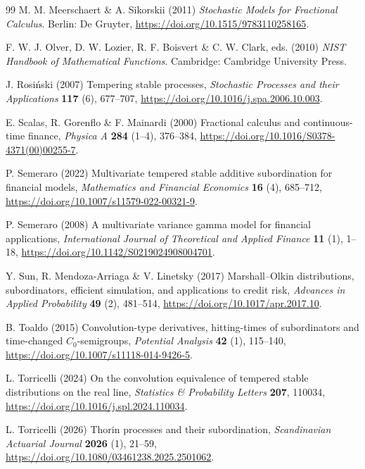 \documentclass{ws-ijtaf}
\begin{document}
\begin{thebibliography}{99}
 M. M. Meerschaert \&
A. Sikorskii (2011) {\it Stochastic Models for Fractional Calculus}. Berlin: De
Gruyter, \url{https://doi.org/10.1515/9783110258165}.

 F. W. J. Olver, D. W. Lozier,
R. F. Boisvert \& C. W. Clark, eds. (2010) {\it NIST Handbook of Mathematical
Functions}. Cambridge: Cambridge University Press.

 J. Rosiński (2007) Tempering stable processes,
{\it Stochastic Processes and their Applications} {\bf 117} (6), 677--707,
\url{https://doi.org/10.1016/j.spa.2006.10.003}.

 E. Scalas, R. Gorenflo \&
F. Mainardi (2000) Fractional calculus and continuous-time finance, {\it
Physica A} {\bf 284} (1--4), 376--384,
\url{https://doi.org/10.1016/S0378-4371(00)00255-7}.

 P. Semeraro (2022) Multivariate tempered
stable additive subordination for financial models, {\it Mathematics and
Financial Economics} {\bf 16} (4), 685--712,
\url{https://doi.org/10.1007/s11579-022-00321-9}.

 P. Semeraro (2008) A multivariate variance
gamma model for financial applications, {\it International Journal of
Theoretical and Applied Finance} {\bf 11} (1), 1--18,
\url{https://doi.org/10.1142/S0219024908004701}.

 Y. Sun, R. Mendoza-Arriaga \&
V. Linetsky (2017) Marshall--Olkin distributions, subordinators, efficient
simulation, and applications to credit risk, {\it Advances in Applied
Probability} {\bf 49} (2), 481--514,
\url{https://doi.org/10.1017/apr.2017.10}.

 B. Toaldo (2015) Convolution-type derivatives,
hitting-times of subordinators and time-changed $C_0$-semigroups, {\it
Potential Analysis} {\bf 42} (1), 115--140,
\url{https://doi.org/10.1007/s11118-014-9426-5}.

 L. Torricelli (2024) On the convolution
equivalence of tempered stable distributions on the real line, {\it Statistics
\& Probability Letters} {\bf 207}, 110034,
\url{https://doi.org/10.1016/j.spl.2024.110034}.

 L. Torricelli (2026) Thorin processes and
their subordination, {\it Scandinavian Actuarial Journal} {\bf 2026} (1),
21--59, \url{https://doi.org/10.1080/03461238.2025.2501062}.

\end{thebibliography}
\end{document}
